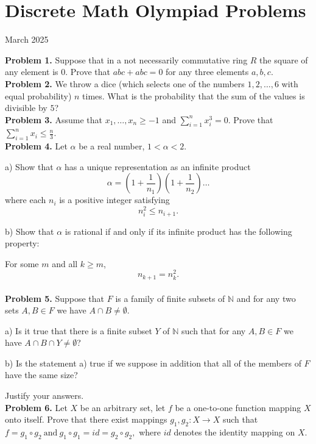 \documentclass{article}
\begin{document}
\pagestyle{plain}

\section*{Discrete Math Olympiad Problems}

\begin{center}
March 2025
\end{center}

\textbf{Problem 1.}
Suppose that in a not necessarily commutative ring $R$ the square of any element is $0$.
Prove that $abc + abc = 0$ for any three elements $a, b, c$.
\\

\textbf{Problem 2.}
We throw a dice (which selects one of the numbers $1,2,\dots,6$ with equal probability)
$n$ times. What is the probability that the sum of the values is divisible by $5$?
\\

\textbf{Problem 3.}
Assume that $x_1, \dots, x_n \geq -1$ and $\sum_{i=1}^{n} x_i^3 = 0$.
Prove that $\sum_{i=1}^{n} x_i \leq \frac{n}{3}$.
\\

\textbf{Problem 4.}
Let $\alpha$ be a real number, $1 < \alpha < 2$.

a) Show that $\alpha$ has a unique representation as an infinite product
\[
\alpha = \left( 1 + \frac{1}{n_1} \right) \left( 1 + \frac{1}{n_2} \right) \dots
\]
where each $n_i$ is a positive integer satisfying
\[
n_i^2 \leq n_{i+1}.
\]

b) Show that $\alpha$ is rational if and only if its infinite product has the following property:

For some $m$ and all $k \geq m$,
\[
n_{k+1} = n_k^2.
\]
\\

\textbf{Problem 5.}
Suppose that $F$ is a family of finite subsets of $\mathbb{N}$ and for any two sets $A,B \in F$ we have $A \cap B \neq \emptyset$.

a) Is it true that there is a finite subset $Y$ of $\mathbb{N}$ such that for any $A,B \in F$ we have $A \cap B \cap Y \neq \emptyset$?

b) Is the statement a) true if we suppose in addition that all of the members of $F$ have the same size?

Justify your answers.
\\

\textbf{Problem 6.}
Let $X$ be an arbitrary set, let $f$ be a one-to-one function mapping $X$ onto itself.
Prove that there exist mappings $g_1, g_2 : X \to X$ such that
\(
f = g_1 \circ g_2 \ \text{and} \  g_1 \circ g_1 = id = g_2 \circ g_2,
\)
where $id$ denotes the identity mapping on $X$.
\\
\end{document}
